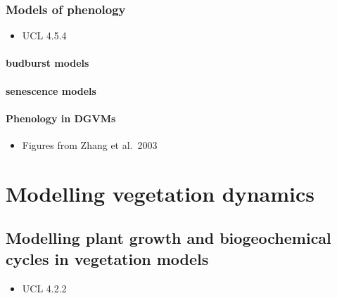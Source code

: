 \documentclass[
  oneside]{book}
\providecommand{\tightlist}{%
  \setlength{\itemsep}{0pt}\setlength{\parskip}{0pt}}
\begin{document}
\hypertarget{models-of-phenology}{%
\section{Models of phenology}\label{models-of-phenology}}

\begin{itemize}
\tightlist
\item
  UCL 4.5.4
\end{itemize}

\hypertarget{budburst-models}{%
\subsection{budburst models}\label{budburst-models}}

\hypertarget{senescence-models}{%
\subsection{senescence models}\label{senescence-models}}

\hypertarget{phenology-in-dgvms}{%
\subsection{Phenology in DGVMs}\label{phenology-in-dgvms}}

\begin{itemize}
\tightlist
\item
  Figures from Zhang et al.~2003
\end{itemize}

\hypertarget{part-modelling-vegetation-dynamics}{%
\part{Modelling vegetation dynamics}\label{part-modelling-vegetation-dynamics}}

\hypertarget{modelling-plant-growth-and-biogeochemical-cycles-in-vegetation-models}{%
\chapter{Modelling plant growth and biogeochemical cycles in vegetation models}\label{modelling-plant-growth-and-biogeochemical-cycles-in-vegetation-models}}


\begin{itemize}
\tightlist
\item
  UCL 4.2.2
\end{itemize}
\end{document}
